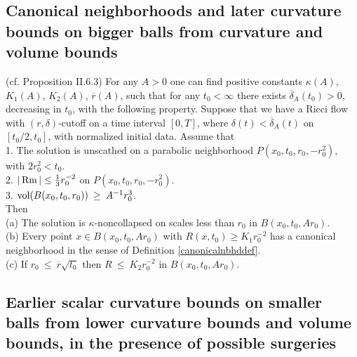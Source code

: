 \subsection{Canonical neighborhoods and later curvature bounds on bigger balls from curvature and volume bounds}

\begin{proposition}
  \label{prop:kl-canonical-neighborhoods-later-curvature-bounds-bigger-balls-from-curvatu-existence-canonical-neighborhoods}

(cf. Proposition II.6.3)
For any $A > 0$ one can find positive constants $\kappa(A)$, $K_1(A)$, $K_2(A)$,
$\overline{r}(A)$,
such that for any $t_0 < \infty$
there exists $\overline{\delta}_{A}(t_0)
> 0$, decreasing in $t_0$, with the following property.  Suppose that
we have a Ricci flow with $(r, \delta)$-cutoff on a time interval
$[0, T]$, where $\delta(t) < \overline{\delta}_A(t)$ on $[t_0/2, t_0]$, with
normalized initial data.  Assume that \\
1. The solution is unscathed on a parabolic neighborhood
$P(x_0, t_0, r_0, -r_0^2)$, with $2r_0^2 < t_0$. \\
2.
$|\operatorname{Rm}| \le \frac13 r_0^{-2}$
on $P(x_0, t_0, r_0, -r_0^2)$. \\
3. $\operatorname{vol}(B(x_0, t_0, r_0)) \: \ge \: A^{-1} r_0^3$.\\

Then\\
(a) The solution is $\kappa$-noncollapsed on scales less than $r_0$
in $B(x_0, t_0, Ar_0)$.\\
(b) Every point $x \in B(x_0, t_0, Ar_0)$ with $R(x, t_0) \ge K_1 r_0^{-2}$
has a canonical neighborhood in the sense of
Definition \ref{canonicalnbhddef}.\\
(c) If $r_0 \: \le \: \overline{r} \sqrt{t_0}$ then $R \: \le \: K_2
r_0^{-2}$ in $B(x_0, t_0, Ar_0)$.
\end{proposition}

\subsection{Earlier scalar curvature bounds on smaller balls from lower curvature bounds and volume bounds, in the presence of possible surgeries}

